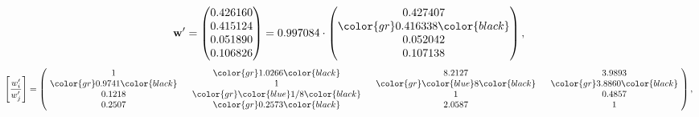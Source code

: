 \begin{example}
\begin{equation*}
\mathbf{w}^{\prime} =
\begin{pmatrix}
0.426160\\
0.415124\\
0.051890\\
0.106826
\end{pmatrix} =
0.997084\cdot
\begin{pmatrix}
0.427407\\
\color{gr} 0.416338\color{black} \\
0.052042\\
0.107138
\end{pmatrix},
\end{equation*}
\begin{equation*}
\left[ \frac{{w}^{\prime}_i}{{w}^{\prime}_j} \right] =
\begin{pmatrix}
$\,\,$ 1 $\,\,$ & $\,\,$\color{gr} 1.0266\color{black} $\,\,$ & $\,\,$8.2127$\,\,$ & $\,\,$3.9893$\,\,$ \\
$\,\,$\color{gr} 0.9741\color{black} $\,\,$ & $\,\,$ 1 $\,\,$ & $\,\,$\color{gr} \color{blue} 8\color{black} $\,\,$ & $\,\,$\color{gr} 3.8860\color{black}   $\,\,$ \\
$\,\,$0.1218$\,\,$ & $\,\,$\color{gr} \color{blue}  1/8\color{black} $\,\,$ & $\,\,$ 1 $\,\,$ & $\,\,$0.4857 $\,\,$ \\
$\,\,$0.2507$\,\,$ & $\,\,$\color{gr} 0.2573\color{black} $\,\,$ & $\,\,$2.0587$\,\,$ & $\,\,$ 1  $\,\,$ \\
\end{pmatrix},
\end{equation*}
\end{example}
\newpage
